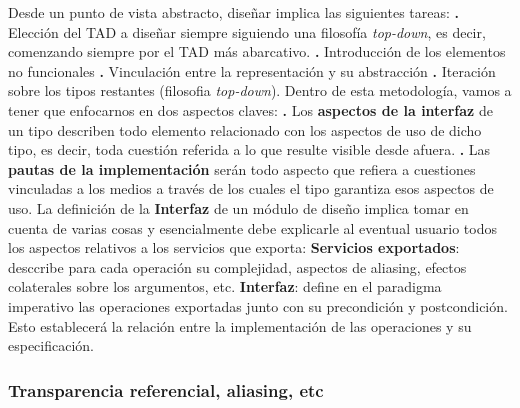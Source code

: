 \documentclass[10pt,a4paper]{article}
\begin{document}
Desde un punto de vista abstracto, diseñar implica las siguientes tareas:
\newline
\newline
\textbf{.} Elección del TAD a diseñar siempre siguiendo una filosofía \textit{top-down}, es decir, comenzando siempre por el TAD más abarcativo.
\newline
\newline
\textbf{.} Introducción de los elementos no funcionales
\newline
\newline
\textbf{.} Vinculación entre la representación y su abstracción
\newline
\newline
\textbf{.} Iteración sobre los tipos restantes (filosofia \textit{top-down}).
\newline
\newline
Dentro de esta metodología, vamos a tener que enfocarnos en dos aspectos claves:
\newline
\newline
\textbf{.} Los \textbf{aspectos de la interfaz} de un tipo describen todo elemento relacionado con los aspectos de uso de dicho tipo, es decir, toda cuestión referida a lo que resulte visible desde afuera.
\newline
\newline
\textbf{.} Las \textbf{pautas de la implementación} serán todo aspecto que refiera a cuestiones vinculadas a los medios a través de los cuales el tipo garantiza esos aspectos de uso.
\newline
\newline
La definición de la \textbf{Interfaz} de un módulo de diseño implica tomar en cuenta de varias cosas y esencialmente debe explicarle al eventual usuario todos los aspectos relativos a los servicios que exporta:
\newline
\newline
\textbf{Servicios exportados}: desccribe para cada operación su complejidad, aspectos de aliasing, efectos colaterales sobre los argumentos, etc.
\newline
\newline
\textbf{Interfaz}: define en el paradigma imperativo las operaciones exportadas junto con su precondición y postcondición. Esto establecerá la relación entre la implementación de las operaciones y su especificación. 

\subsubsection{Transparencia referencial, aliasing, etc}
\end{document}
